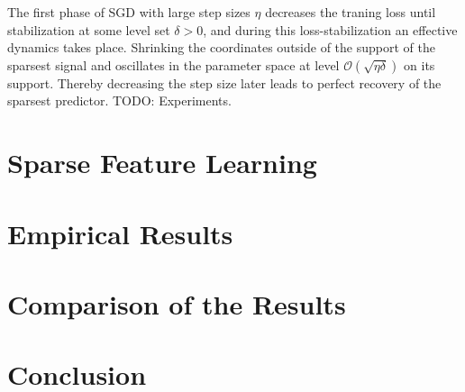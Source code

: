 The first phase of SGD with large step sizes $\eta$ decreases the traning
loss until stabilization at some level set $\delta > 0$, and during this
loss-stabilization an effective dynamics takes place. Shrinking the
coordinates outside of the support of the sparsest signal and oscillates in
the parameter space at level $\mathcal{O}(\sqrt{\eta\delta})$ on its support.
Thereby decreasing the step size later leads to perfect recovery of the
sparsest predictor. TODO: Experiments.

\newline





\section{Sparse Feature Learning}

\section{Empirical Results}

\section{Comparison of the Results}

\section{Conclusion}



\nocite{andriushchenko2023sgd}
\nocite{shalev2014understanding}
\nocite{fast_armijo_2022}
\printbibliography


